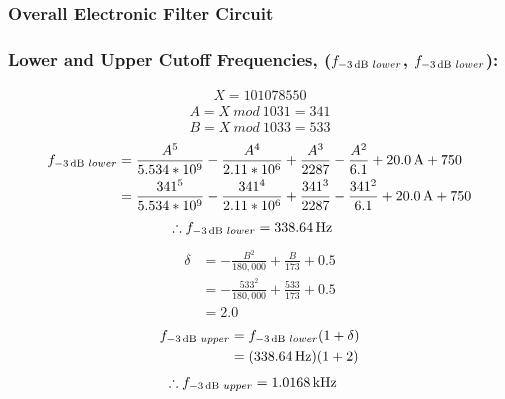 \documentclass[hidelinks]{article}
\begin{document}
	\subsubsection{Overall Electronic Filter Circuit}
	\subsubsection*{Lower and Upper Cutoff Frequencies, ($f_{\SI{-3}{\decibel}\hspace{1mm} lower}$, $f_{\SI{-3}{\decibel}\hspace{1mm} lower}$):}
	\begin{align*}
		X = 101078550
	\end{align*}
	\begin{align*}
		A = X\ mod\ 1031 = 341\\
		B = X\ mod\ 1033 = 533
	\end{align*}
	\begin{align}
		f_{\SI{-3}{\decibel}\hspace{1mm} lower} &= \frac{A^{5}}{5.534 * 10^{9}} - \frac{A^{4}}{2.11 * 10^{6}} + \frac{A^{3}}{2287} - \frac{A^{2}}{6.1} + \SI{20.0}{\ampere} + 750\\
		&= \frac{341^{5}}{5.534 * 10^{9}} - \frac{341^{4}}{2.11 * 10^{6}} + \frac{341^{3}}{2287} - \frac{341^{2}}{6.1} + \SI{20.0}{\ampere} + 750 \nonumber
	\end{align}
	\begin{align*}
		\therefore f_{\SI{-3}{\decibel}\hspace{1mm} lower} &= \SI{338.64}{\hertz}
	\end{align*}
	\begin{align}
		\delta &= - \frac{B^{2}}{180,000} + \frac{B}{173} + 0.5\\
		&= - \frac{533^{2}}{180,000} + \frac{533}{173} + 0.5 \nonumber\\
		&= 2.0 \nonumber
	\end{align}
	\begin{align}
		f_{\SI{-3}{\decibel}\hspace{1mm} upper} &= f_{\SI{-3}{\decibel}\hspace{1mm} lower} (1 + \delta)\\
		&= (\SI{338.64}{\hertz} )(1+2) \nonumber
	\end{align}
	\begin{align*}
		\therefore f_{\SI{-3}{\decibel}\hspace{1mm} upper} &= \SI{1.0168}{k\hertz}
	\end{align*}
	\pagebreak
\end{document}

